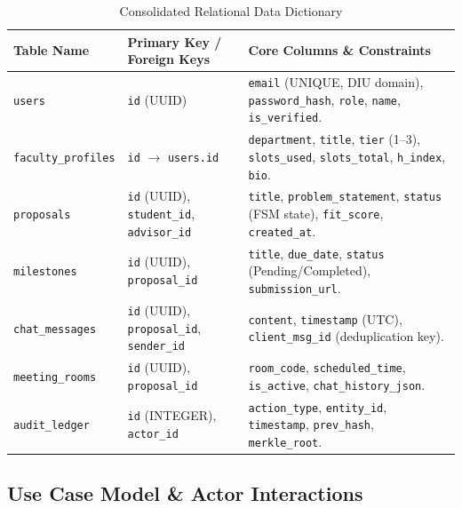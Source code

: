 \documentclass[10.5pt,a4paper]{article}
\begin{document}
\begin{table}[h]
\centering
\footnotesize
\begin{tabularx}{\linewidth}{|l|l|X|}
\hline
\rowcolor{headergray} \textbf{Table Name} & \textbf{Primary Key / Foreign Keys} & \textbf{Core Columns \& Constraints} \\ \hline
\texttt{users} & \texttt{id} (UUID) & \texttt{email} (UNIQUE, DIU domain), \texttt{password\_hash}, \texttt{role}, \texttt{name}, \texttt{is\_verified}. \\ \hline
\texttt{faculty\_profiles} & \texttt{id} $\rightarrow$ \texttt{users.id} & \texttt{department}, \texttt{title}, \texttt{tier} (1--3), \texttt{slots\_used}, \texttt{slots\_total}, \texttt{h\_index}, \texttt{bio}. \\ \hline
\texttt{proposals} & \texttt{id} (UUID), \texttt{student\_id}, \texttt{advisor\_id} & \texttt{title}, \texttt{problem\_statement}, \texttt{status} (FSM state), \texttt{fit\_score}, \texttt{created\_at}. \\ \hline
\texttt{milestones} & \texttt{id} (UUID), \texttt{proposal\_id} & \texttt{title}, \texttt{due\_date}, \texttt{status} (Pending/Completed), \texttt{submission\_url}. \\ \hline
\texttt{chat\_messages} & \texttt{id} (UUID), \texttt{proposal\_id}, \texttt{sender\_id} & \texttt{content}, \texttt{timestamp} (UTC), \texttt{client\_msg\_id} (deduplication key). \\ \hline
\texttt{meeting\_rooms} & \texttt{id} (UUID), \texttt{proposal\_id} & \texttt{room\_code}, \texttt{scheduled\_time}, \texttt{is\_active}, \texttt{chat\_history\_json}. \\ \hline
\texttt{audit\_ledger} & \texttt{id} (INTEGER), \texttt{actor\_id} & \texttt{action\_type}, \texttt{entity\_id}, \texttt{timestamp}, \texttt{prev\_hash}, \texttt{merkle\_root}. \\ \hline
\end{tabularx}
\caption{Consolidated Relational Data Dictionary}
\end{table}

\clearpage

\subsection{Use Case Model \& Actor Interactions}
\end{document}
